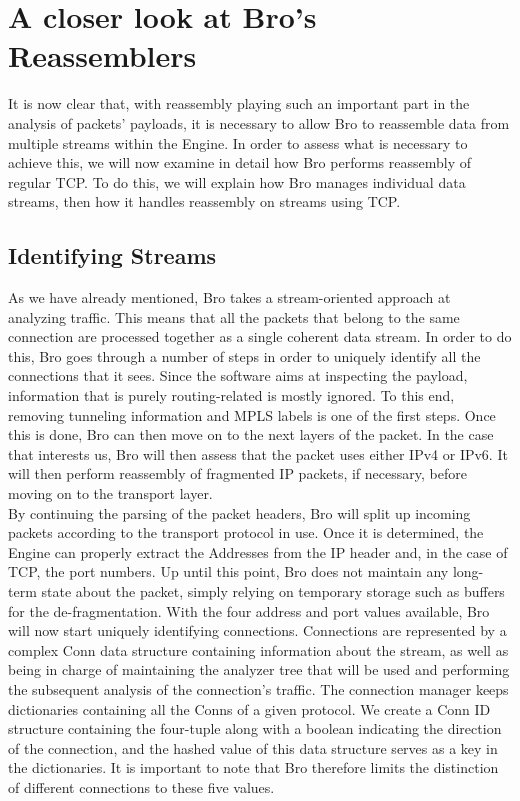 
\chapter{A closer look at Bro's Reassemblers} \label{chap:deeper}

It is now clear that, with reassembly playing such an important part in the analysis of packets' payloads, it is necessary to allow Bro to reassemble data from multiple streams within the Engine. In order to assess what is necessary to achieve this, we will now examine in detail how Bro performs reassembly of regular TCP. To do this, we will explain how Bro manages individual data streams, then how it handles reassembly on streams using TCP.

\section{Identifying Streams}
As we have already mentioned, Bro takes a stream-oriented approach at analyzing traffic. This means that all the packets that belong to the same connection are processed together as a single coherent data stream. In order to do this, Bro goes through a number of steps in order to uniquely identify all the connections that it sees. Since the software aims at inspecting the payload, information that is purely routing-related is mostly ignored. To this end, removing tunneling information and MPLS labels is one of the first steps. Once this is done, Bro can then move on to the next layers of the packet. In the case that interests us, Bro will then assess that the packet uses either IPv4 or IPv6. It will then perform reassembly of fragmented IP packets, if necessary, before moving on to the transport layer. \\

By continuing the parsing of the packet headers, Bro will split up incoming packets according to the transport protocol in use. Once it is determined, the Engine can properly extract the Addresses from the IP header and, in the case of TCP, the port numbers. Up until this point, Bro does not maintain any long-term state about the packet, simply relying on temporary storage such as buffers for the de-fragmentation. With the four address and port values available, Bro will now start uniquely identifying connections. Connections are represented by a complex Conn data structure containing information about the stream, as well as being in charge of maintaining the analyzer tree that will be used and performing the subsequent analysis of the connection's traffic. The connection manager keeps dictionaries containing all the Conns of a given protocol. We create a Conn ID structure containing the four-tuple along with a boolean indicating the direction of the connection, and the hashed value of this data structure serves as a key in the dictionaries. It is important to note that Bro therefore limits the distinction of different connections to these five values.\\

